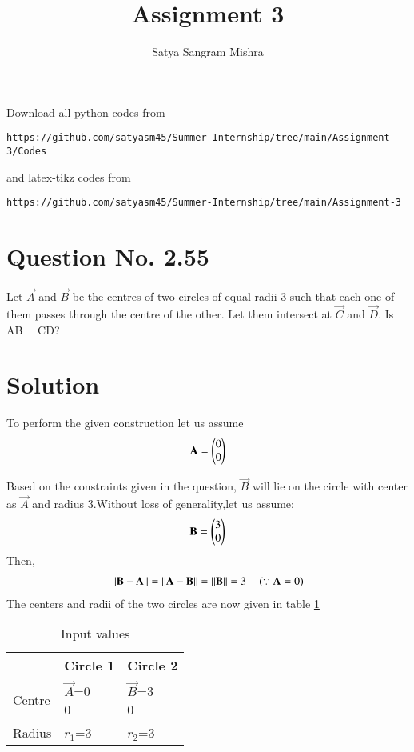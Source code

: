 \documentclass[journal,12pt,twocolumn]{IEEEtran}
\begin{document}
     \def\centbox#1{\makebox[0in]{#1}}
     \def\topbox#1{\raisebox{-\baselineskip}[0in][0in]{#1}}
     \def\midbox#1{\raisebox{-0.5\baselineskip}[0in][0in]{#1}}
\vspace{3cm}
\title{Assignment 3}
\author{Satya Sangram Mishra}
\maketitle
\newpage
\bigskip
\renewcommand{\thefigure}{\theenumi}
\renewcommand{\thetable}{\theenumi}
Download all python codes from 
\begin{lstlisting}
https://github.com/satyasm45/Summer-Internship/tree/main/Assignment-3/Codes
\end{lstlisting}
%
and latex-tikz codes from 
%
\begin{lstlisting}
https://github.com/satyasm45/Summer-Internship/tree/main/Assignment-3
\end{lstlisting}
%
\section{Question No. 2.55}
Let $\vec{A}$ and $\vec{B}$ be the centres of two circles
of equal radii 3 such that each one of them
passes through the centre of the other. Let them
intersect at $\vec{C}$ and $\vec{D}$. Is AB$\perp$CD?
%
\section{Solution}
To perform the given construction let us assume 
\begin{align}
\mathbf{A}=\begin{pmatrix}0\\0\end{pmatrix}
\end{align}

Based on the constraints given in the question, $\vec{B}$ will lie on the circle with center as $\vec{A}$ and radius 3.Without loss of generality,let us assume:
\begin{align}
\mathbf{B}=\begin{pmatrix}3\\0\end{pmatrix}
\end{align}
Then,
\begin{align}
\lVert\mathbf{B}-\mathbf{A}\rVert = \lVert\mathbf{A}-\mathbf{B}\rVert=\lVert\mathbf{B}\rVert  = 3 \quad \left(\because \mathbf{A}=0\right)
\end{align}
The centers and radii of the two circles are now given in table \ref{tab:table1}
\begin{table}[!ht]
\begin{center}
\begin{tabular}{ | m{2cm} | m{2cm} | m{2cm} |} 
\hline
 & Circle 1 & Circle 2 \\
\hline
Centre  & $\vec{A}$=\myvec{0\\0} & $\vec{B}$=\myvec{3\\0} \\ 
\hline
Radius & $r_{1}$=3 &$r_{2}$=3  \\ 
\hline
\end{tabular}
\end{center}
\caption{Input values}
\label{tab:table1}

\end{table}
\end{document}

